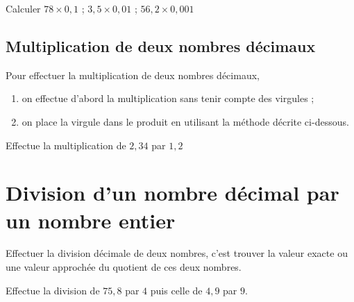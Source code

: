 \documentclass[a4paper,10pt]{report}
\begin{document}
\begin{ex}
Calculer $78\times 0,1$ ; \quad $3,5\times 0,01$ ; \quad $56,2\times 0,001$

\noindent\grandscarreaux{\linewidth}{4.8cm}
\end{ex}

\subsection{Multiplication de deux nombres décimaux}

\begin{prop}
Pour effectuer la multiplication de deux nombres décimaux,
\begin{enumerate}
\item[•]on effectue d'abord la multiplication sans tenir compte des virgules ;
\item[•]on place la virgule dans le produit en utilisant la méthode décrite ci-dessous.
\end{enumerate}
\end{prop}

\begin{ex}
Effectue la multiplication de $2,34$ par $1,2$

\noindent\grandscarreaux{\linewidth}{4.8cm}
\end{ex}

\section{Division d’un nombre décimal par un nombre entier}

\begin{prop}
Effectuer la division décimale de deux nombres, c'est trouver la valeur exacte ou une valeur approchée du quotient de ces deux nombres.
\end{prop}

\begin{ex}
Effectue la division de $75,8$ par $4$ puis celle de $4,9$ par $9$.

\noindent\grandscarreaux{\linewidth}{10cm}
\end{ex}
\end{document}
